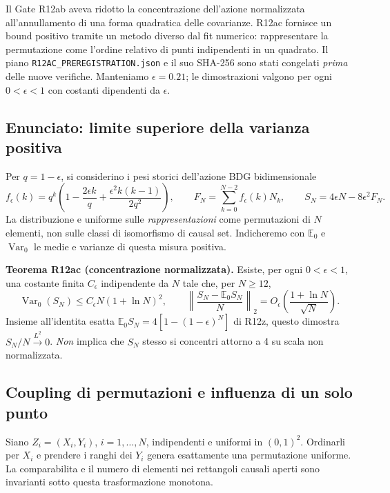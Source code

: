 \documentclass[11pt,a4paper]{article}
\begin{document}
Il Gate R12ab aveva ridotto la concentrazione dell'azione normalizzata all'annullamento di una forma quadratica delle covarianze. R12ac fornisce un bound positivo tramite un metodo diverso dal fit numerico: rappresentare la permutazione come l'ordine relativo di punti indipendenti in un quadrato. Il piano \texttt{R12AC\_PREREGISTRATION.json} e il suo SHA-256 sono stati congelati \emph{prima} delle nuove verifiche. Manteniamo $\epsilon=0.21$; le dimostrazioni valgono per ogni $0<\epsilon<1$ con costanti dipendenti da $\epsilon$.

\subsection{Enunciato: limite superiore della varianza positiva}

Per $q=1-\epsilon$, si considerino i pesi storici dell'azione BDG bidimensionale
\begin{equation}
 f_\epsilon(k)=q^k\left(1-\frac{2\epsilon k}{q}
 +\frac{\epsilon^2k(k-1)}{2q^2}\right),\qquad
 F_N=\sum_{k=0}^{N-2}f_\epsilon(k)N_k,\qquad
 S_N=4\epsilon N-8\epsilon^2 F_N.
 \label{eq:r12ac_f}
\end{equation}
La distribuzione e uniforme sulle \emph{rappresentazioni} come permutazioni di $N$ elementi, non sulle classi di isomorfismo di causal set. Indicheremo con $\mathbb E_0$ e $\operatorname{Var}_0$ le medie e varianze di questa misura positiva.

\noindent\textbf{Teorema R12ac (concentrazione normalizzata).} Esiste, per ogni $0<\epsilon<1$, una costante finita $C_\epsilon$ indipendente da $N$ tale che, per $N\ge12$,
\begin{equation}
 \boxed{\operatorname{Var}_0(S_N)\le
 C_\epsilon N(1+\ln N)^2,\qquad
 \left\|\frac{S_N-\mathbb E_0S_N}{N}\right\|_2
 =O_\epsilon\!\left(\frac{1+\ln N}{\sqrt N}\right).}
 \label{eq:r12ac_main}
\end{equation}
Insieme all'identita esatta $\mathbb E_0S_N=4[1-(1-\epsilon)^N]$ di R12z, questo dimostra $S_N/N\xrightarrow{L^2}0$. \emph{Non} implica che $S_N$ stesso si concentri attorno a 4 su scala non normalizzata.

\subsection{Coupling di permutazioni e influenza di un solo punto}

Siano $Z_i=(X_i,Y_i)$, $i=1,\ldots,N$, indipendenti e uniformi in $(0,1)^2$. Ordinarli per $X_i$ e prendere i ranghi dei $Y_i$ genera esattamente una permutazione uniforme. La comparabilita e il numero di elementi nei rettangoli causali aperti sono invarianti sotto questa trasformazione monotona.
\end{document}
